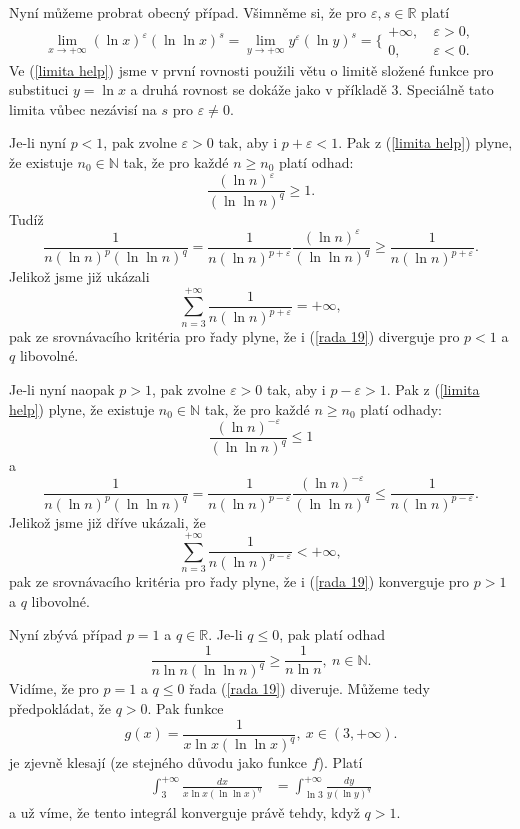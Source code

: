 \documentclass[answers]{exam}
\begin{document}
\begin{questions}
\begin{solution}
		Nyn\'i m\r u\v zeme probrat obecn\'y p\v r\'ipad. V\v simn\v eme si, \v ze pro $\varepsilon,s\in\mathbb R$ plat\'i
		\begin{equation}\label{limita help}
		\lim_{x\to+\infty}(\ln x)^{\varepsilon}(\ln\ln x)^{s}=\lim_{y\to+\infty}y^{\varepsilon}(\ln y)^{s}=\bigg\{
		\begin{matrix}
		+\infty,&\ \varepsilon>0,\\
		0,&\ \varepsilon<0.
		\end{matrix}
		\end{equation}
		Ve (\ref{limita help}) jsme v prvn\'i rovnosti pou\v zili v\v etu o limit\v e slo\v zen\'e funkce pro substituci $y=\ln x$ a druh\'a rovnost se dok\'a\v ze jako v p\v r\'iklad\v e 3. Speci\'aln\v e tato limita v\r ubec nez\'avis\'i na $s$ pro $\varepsilon\ne0$. 
		
		Je-li nyn\'i $p<1$, pak zvolne $\varepsilon>0$ tak, aby i $p+\varepsilon<1$. Pak z (\ref{limita help}) plyne, \v ze existuje $n_0\in\mathbb N$ tak, \v ze pro ka\v zd\'e $n\ge n_0$ plat\'i odhad:
		$$\frac{(\ln n)^{\varepsilon}}{(\ln\ln n)^q}\ge1.$$
		Tud\'i\v z
		$$\frac{1}{n(\ln n)^p(\ln\ln n)^q}=\frac{1}{n(\ln n)^{p+\varepsilon}}\frac{(\ln n)^{\varepsilon}}{(\ln\ln n)^q}\ge\frac{1}{n(\ln n)^{p+\varepsilon}}.$$
		Jeliko\v z jsme ji\v z uk\'azali
		$$\sum_{n=3}^{+\infty}\frac{1}{n(\ln n)^{p+\varepsilon}}=+\infty,$$
		pak ze srovn\'avac\'iho krit\'eria pro \v rady plyne, \v ze i (\ref{rada 19}) diverguje pro $p<1$ a $q$ libovoln\'e.
		
		Je-li nyn\'i naopak $p>1$, pak zvolne $\varepsilon>0$ tak, aby i $p-\varepsilon>1$. Pak z (\ref{limita help}) plyne, \v ze existuje $n_0\in\mathbb N$ tak, \v ze pro ka\v zd\'e $n\ge n_0$ plat\'i odhady:
		$$\frac{(\ln n)^{-\varepsilon}}{(\ln\ln n)^q}\le1$$
		a
		$$\frac{1}{n(\ln n)^p(\ln\ln n)^q}=\frac{1}{n(\ln n)^{p-\varepsilon}}\frac{(\ln n)^{-\varepsilon}}{(\ln\ln n)^q}\le\frac{1}{n(\ln n)^{p-\varepsilon}}.$$
		Jeliko\v z jsme ji\v z d\v r\'ive uk\'azali, \v ze
		$$\sum_{n=3}^{+\infty}\frac{1}{n(\ln n)^{p-\varepsilon}}<+\infty,$$
		pak ze srovn\'avac\'iho krit\'eria pro \v rady plyne, \v ze i (\ref{rada 19}) konverguje pro $p>1$ a $q$ libovoln\'e.
		
		Nyn\'i zb\'yv\'a p\v r\'ipad $p=1$ a $q\in\mathbb R$. Je-li $q\le0$, pak plat\'i odhad
		$$\frac{1}{n\ln n(\ln\ln n)^q}\ge\frac{1}{n\ln n},\ n\in\mathbb N.$$
		Vid\'ime, \v ze pro $p=1$ a $q\le0$ \v rada (\ref{rada 19}) diveruje. M\r u\v zeme tedy p\v redpokl\'adat, \v ze $q>0$. Pak funkce 
		$$g(x)=\frac{1}{x\ln x(\ln\ln x)^q},\ x\in(3,+\infty).$$
		je zjevn\v e klesaj\'i (ze stejn\'eho d\r uvodu jako funkce $f$). Plat\'i
		\begin{align*}
		\int_3^{+\infty}\frac{dx}{x\ln x(\ln\ln x)^q}&=\int_{\ln 3}^{+\infty}\frac{dy}{y(\ln y)^q}
		\end{align*}
		a u\v z v\'ime, \v ze tento integr\'al konverguje pr\'av\v e tehdy, kdy\v z $q>1$. 
		

\end{solution}
\end{questions}
\end{document}
